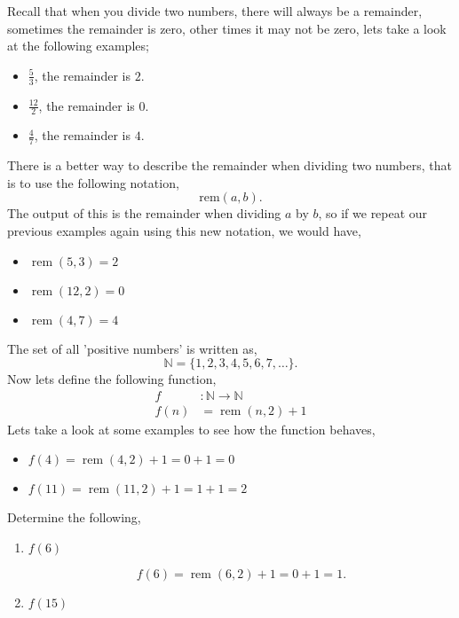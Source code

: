 \documentclass[12pt]{article} %
\newcommand{\rem}[1]{\operatorname{rem}{(#1)}}
\begin{document}
\begin{qstn}
\end{qstn}

\newpage


\begin{qstn} Recall that when you divide two numbers, there will always be a remainder, sometimes the remainder is zero, other
  times it may not be zero, lets take a look at the following examples;
  \begin{itemize}
    \item $\frac{5}{3}$, the remainder is $2$.
    \item $\frac{12}{2}$, the remainder is $0$.
    \item $\frac{4}{7}$, the remainder is $4$. 
  \end{itemize}
  There is a better way to describe the remainder when dividing two numbers, that is to use the following notation,
  \[
        \text{rem}(a,b)
  .\] The output of this is the remainder when dividing $a$ by $b$, so if we repeat our previous examples again using this new
  notation, we would have,
  \begin{itemize}
    \item $\operatorname{rem}(5,3) = 2$
    \item $\operatorname{rem}(12,2) = 0$
    \item $\operatorname{rem}(4,7) = 4$
  \end{itemize}
  The set of all 'positive numbers' is written as,
  \[
        \mathbb N = \{1,2,3,4,5,6,7,\dots\} 
  .\] Now lets define the following function,
  \begin{align*}
    f &\colon \mathbb N \to \mathbb N\\
    f(n) &= \rem{n,2} + 1
  \end{align*}
  Lets take a look at some examples to see how the function behaves,
  \begin{itemize}
    \item $f(4) = \rem{4,2} + 1 = 0 + 1 = 0$
    \item $f(11) = \rem{11,2} + 1 = 1 + 1 = 2$
  \end{itemize}
  Determine the following,
  \begin{enumerate}[label=(\alph*)]
    \item $f(6)$
      \begin{solution}
        \[
            f(6) = \operatorname{rem}(6,2) + 1 = 0 + 1 = 1 
        .\] 
      \end{solution}
    \item $f(15)$
      \begin{solution}

\end{solution}
\end{enumerate}
\end{qstn}
\end{document}
